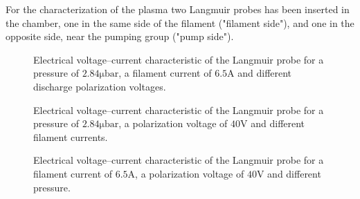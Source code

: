 \documentclass[11pt,a4 paper]{article}
\begin{document}
For the characterization of the plasma two Langmuir probes has been inserted in the chamber, one in the same side of the filament ("filament side"), and one in the opposite side, near the pumping group ("pump side").
%
\begin{figure}[H]
\vspace{-0.3cm}%
 \vspace{-0.3cm}\caption{Electrical voltage--current characteristic of the Langmuir probe for a pressure of $2.84\si{\micro\bar}$, a filament current of $6.5\si{\ampere}$ and different discharge polarization voltages.}\label{fig:Lang}%
\end{figure}%
\vspace{-0.8cm}%
\begin{figure}[H]
  \vspace{-0.3cm}\caption{Electrical voltage--current characteristic of the Langmuir probe for a pressure of $2.84\si{\micro\bar}$, a polarization voltage of $40\si{\volt}$ and different filament currents.}\label{fig:Lang_c}%
\end{figure}%
\vspace{-0.8cm}%
\begin{figure}[H]
  \vspace{-0.3cm}\caption{Electrical voltage--current characteristic of the Langmuir probe for a filament current of $6.5\si{\ampere}$, a polarization voltage of $40\si{\volt}$ and different pressure.}\label{fig:Lang_p}%
\end{figure}
\end{document}
